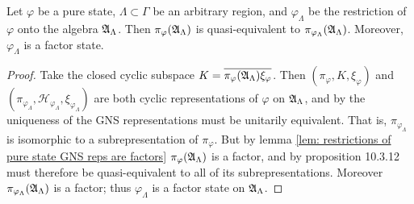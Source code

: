 \documentclass[11pt]{amsart}
\begin{document}
\begin{lem}\label{lem: restrictions of pure states are factor states}
    Let $\varphi$ be a pure state,  $\Lambda\subset\Gamma$ be an arbitrary region, and  $\varphi_\Lambda$ be the restriction of $\varphi$ onto the algebra $\mathfrak{A}_\Lambda$. Then $\pi_\varphi(\mathfrak{A}_\Lambda)$ is quasi-equivalent to $\pi_{\varphi_\Lambda}(\mathfrak{A}_\Lambda)$. Moreover, $\varphi_\Lambda$ is a factor state. 
    \begin{proof}
        Take the closed cyclic subspace $K=\overline{\pi_\varphi(\mathfrak{A}_\Lambda)\xi_\varphi}$. Then $(\pi_\varphi, K,\xi_\varphi)$ and $(\pi_{\varphi_\Lambda}, \mathcal H_{\varphi_\Lambda},\xi_{\varphi_\Lambda})$ are both cyclic representations of $\varphi$ on $\mathfrak{A}_\Lambda$, and by the uniqueness of the GNS representations must be unitarily equivalent. That is, $\pi_{\varphi_\Lambda}$ is isomorphic to a subrepresentation of $\pi_{\varphi}$. But by lemma \ref{lem: restrictions of pure state GNS reps are factors} $\pi_\varphi(\mathfrak{A}_\Lambda)$ is a factor, and by \cite{kadison_1997} proposition 10.3.12 must therefore be quasi-equivalent to all of its subrepresentations. Moreover $\pi_{\varphi_\Lambda}(\mathfrak{A}_\Lambda)$ is a factor; thus $\varphi_\Lambda$ is a factor state on $\mathfrak{A}_\Lambda$.
    \end{proof}
\end{lem}
\end{document}
